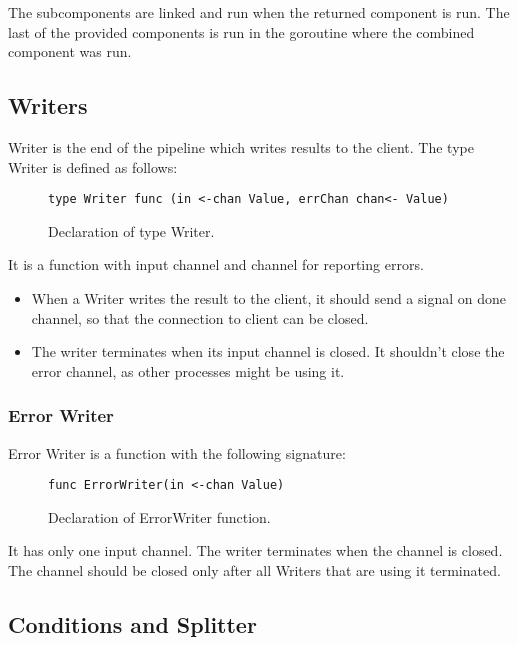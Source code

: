 \documentclass[12pt,a4paper]{article}
\begin{document}
The subcomponents are linked and run when the returned component is run. 
The last of the provided components is run in the goroutine where
the combined component was run.

\subsection{Writers}
Writer is the end of the pipeline which writes results to the client.
The type Writer is defined as follows:

\begin{figure}[h]
\centering
\begin{lstlisting}
type Writer func (in <-chan Value, errChan chan<- Value)
\end{lstlisting}
\caption[scale=1.0]{Declaration of type Writer.}
\label{fig:Writer}
\end{figure}

It is a function with input channel and channel for reporting errors.
\begin{itemize}
	\item When a Writer writes the result to the client, it should send a signal
				on done channel, so that the connection to client can be closed.
	\item The writer terminates when its input channel is closed. It shouldn't
			  close the error channel, as other processes might be using it.
\end{itemize}

\subsubsection{Error Writer}
Error Writer is a function with the following signature:

\begin{figure}[h]
\centering
\begin{lstlisting}
func ErrorWriter(in <-chan Value)
\end{lstlisting}
\caption[scale=1.0]{Declaration of ErrorWriter function.}
\label{fig:ErrorWriter}
\end{figure}

It has only one input channel. The writer terminates when the channel
is closed. The channel should be closed only after all Writers that 
are using it terminated.

\subsection{Conditions and Splitter}
\end{document}
